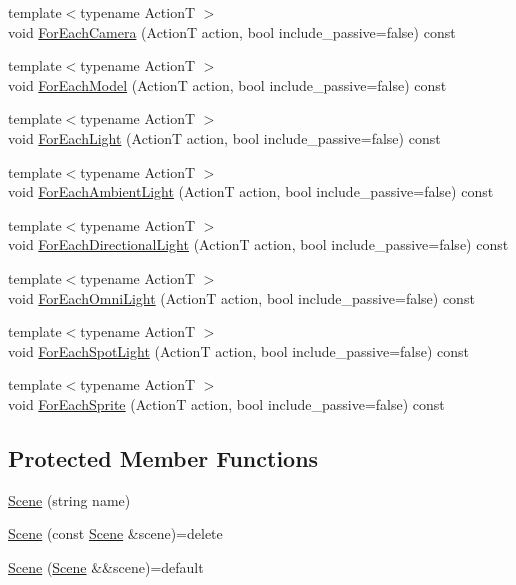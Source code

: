 \begin{DoxyCompactItemize}
\item 
{\footnotesize template$<$typename ActionT $>$ }\\void \hyperlink{classmage_1_1_scene_a196159c991332f06faaee3c6ce0ff780}{For\+Each\+Camera} (ActionT action, bool include\+\_\+passive=false) const
\item 
{\footnotesize template$<$typename ActionT $>$ }\\void \hyperlink{classmage_1_1_scene_a6df0662b829691415f50ea1d45341582}{For\+Each\+Model} (ActionT action, bool include\+\_\+passive=false) const
\item 
{\footnotesize template$<$typename ActionT $>$ }\\void \hyperlink{classmage_1_1_scene_a7ef0664366aa29c4dff89329d3fb5759}{For\+Each\+Light} (ActionT action, bool include\+\_\+passive=false) const
\item 
{\footnotesize template$<$typename ActionT $>$ }\\void \hyperlink{classmage_1_1_scene_a0b05bd65003dfb02124dd00762950a16}{For\+Each\+Ambient\+Light} (ActionT action, bool include\+\_\+passive=false) const
\item 
{\footnotesize template$<$typename ActionT $>$ }\\void \hyperlink{classmage_1_1_scene_ab1b4131911bf2457707fae459d999f85}{For\+Each\+Directional\+Light} (ActionT action, bool include\+\_\+passive=false) const
\item 
{\footnotesize template$<$typename ActionT $>$ }\\void \hyperlink{classmage_1_1_scene_a9dae59b09d5167d027fc4cf8f09b961c}{For\+Each\+Omni\+Light} (ActionT action, bool include\+\_\+passive=false) const
\item 
{\footnotesize template$<$typename ActionT $>$ }\\void \hyperlink{classmage_1_1_scene_af7419b0edf8a0cae6b113d18231a910a}{For\+Each\+Spot\+Light} (ActionT action, bool include\+\_\+passive=false) const
\item 
{\footnotesize template$<$typename ActionT $>$ }\\void \hyperlink{classmage_1_1_scene_af33b14f081e0b3ae5dafc807bb6bf5b4}{For\+Each\+Sprite} (ActionT action, bool include\+\_\+passive=false) const
\end{DoxyCompactItemize}
\subsection*{Protected Member Functions}
\begin{DoxyCompactItemize}
\item 
\hyperlink{classmage_1_1_scene_aaed505892f2a639db47e5d5767f41337}{Scene} (string name)
\item 
\hyperlink{classmage_1_1_scene_a88d83ccb2e10549d5370f850b2b4c228}{Scene} (const \hyperlink{classmage_1_1_scene}{Scene} \&scene)=delete
\item 
\hyperlink{classmage_1_1_scene_a35b8fc4242c2348e53014b96416fc3d3}{Scene} (\hyperlink{classmage_1_1_scene}{Scene} \&\&scene)=default
\end{DoxyCompactItemize}
